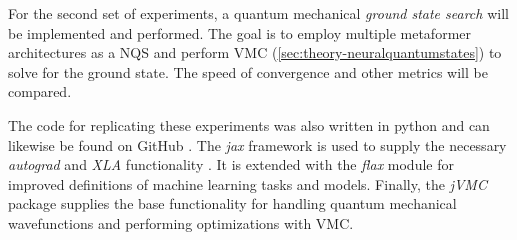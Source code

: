 For the second set of experiments, a quantum mechanical \emph{ground state search} will be implemented and performed.
The goal is to employ multiple metaformer architectures as a NQS and perform VMC (\autoref{sec:theory-neuralquantumstates}) to solve for the ground state.
The speed of convergence and other metrics will be compared.

The code for replicating these experiments was also written in python and can likewise be found on GitHub \cite{selfPhysics}.
The \emph{jax} framework is used to supply the necessary \emph{autograd} and \emph{XLA} functionality \cite{jaxGithub}.
It is extended with the \emph{flax} \cite{flaxGithub} module for improved definitions of machine learning tasks and models.
Finally, the \emph{jVMC} \cite{jVMCgithub} package supplies the base functionality for handling quantum mechanical wavefunctions and performing optimizations with VMC.

